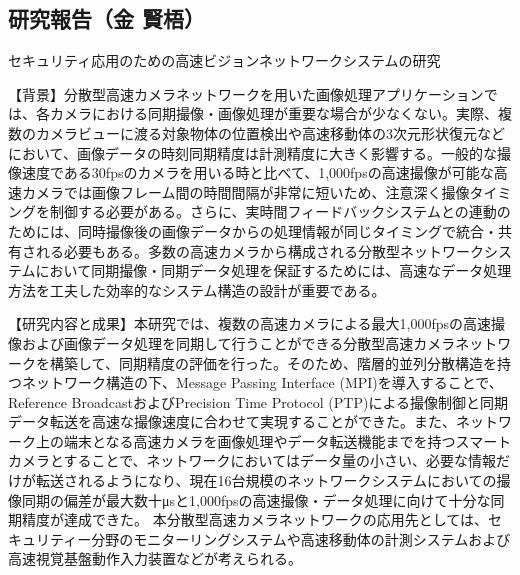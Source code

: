 \subsection{研究報告（金 賢梧）}

セキュリティ応用のための高速ビジョンネットワークシステムの研究

【背景】分散型高速カメラネットワークを用いた画像処理アプリケーションでは、各カメラにおける同期撮像・画像処理が重要な場合が少なくない。実際、複数のカメラビューに渡る対象物体の位置検出や高速移動体の3次元形状復元などにおいて、画像データの時刻同期精度は計測精度に大きく影響する。一般的な撮像速度である30fpsのカメラを用いる時と比べて、1,000fpsの高速撮像が可能な高速カメラでは画像フレーム間の時間間隔が非常に短いため、注意深く撮像タイミングを制御する必要がある。さらに、実時間フィードバックシステムとの連動のためには、同時撮像後の画像データからの処理情報が同じタイミングで統合・共有される必要もある。多数の高速カメラから構成される分散型ネットワークシステムにおいて同期撮像・同期データ処理を保証するためには、高速なデータ処理方法を工夫した効率的なシステム構造の設計が重要である。

【研究内容と成果】本研究では、複数の高速カメラによる最大1,000fpsの高速撮像および画像データ処理を同期して行うことができる分散型高速カメラネットワークを構築して、同期精度の評価を行った。そのため、階層的並列分散構造を持つネットワーク構造の下、Message Passing Interface (MPI)を導入することで、Reference BroadcastおよびPrecision Time Protocol (PTP)による撮像制御と同期データ転送を高速な撮像速度に合わせて実現することができた。また、ネットワーク上の端末となる高速カメラを画像処理やデータ転送機能までを持つスマートカメラとすることで、ネットワークにおいてはデータ量の小さい、必要な情報だけが転送されるようになり、現在16台規模のネットワークシステムにおいての撮像同期の偏差が最大数十μsと1,000fpsの高速撮像・データ処理に向けて十分な同期精度が達成できた。 本分散型高速カメラネットワークの応用先としては、セキュリティー分野のモニターリングシステムや高速移動体の計測システムおよび高速視覚基盤動作入力装置などが考えられる。
